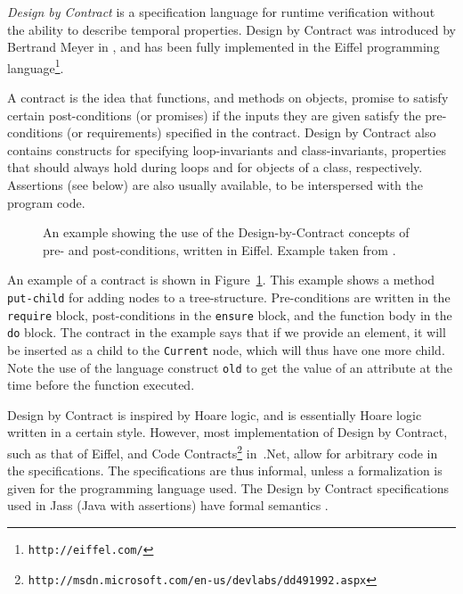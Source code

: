 \textit{Design by Contract} is a specification language for runtime
verification without the ability to describe temporal properties. Design by
Contract was introduced by Bertrand Meyer in \cite{meyer92applyingdbc}, and has
been fully implemented in the Eiffel programming
language\footnote{\texttt{http://eiffel.com/}}.

A contract is the idea that functions, and methods on objects, promise to
satisfy certain post-conditions (or promises) if the inputs they are given
satisfy the pre-conditions (or requirements) specified in the contract. Design
by Contract also contains constructs for specifying loop-invariants and
class-invariants, properties that should always hold during loops and for
objects of a class, respectively. Assertions (see below) are also usually
available, to be interspersed with the program code.

\begin{figure}[h!]
	\begin{center}
	\begin{minipage}{0.7\textwidth}
    \lstset{language=Eiffel}
		
	\end{minipage}
	\end{center}
  \caption{An example showing the use of the Design-by-Contract concepts of
    pre- and post-conditions, written in Eiffel. Example taken from
    \cite{meyer92applyingdbc}.}
	\label{figure-dbc-example}
\end{figure}

An example of a contract is shown in Figure~\ref{figure-dbc-example}. This
example shows a method \texttt{put-child} for adding nodes to a tree-structure.
Pre-conditions are written in the \texttt{require} block, post-conditions in
the \texttt{ensure} block, and the function body in the \texttt{do} block. The
contract in the example says that if we provide an element, it will be inserted
as a child to the \texttt{Current} node, which will thus have one more child.
Note the use of the language construct \texttt{old} to get the value of an
attribute at the time before the function executed.

Design by Contract is inspired by Hoare logic, and is essentially Hoare logic
written in a certain style. However, most implementation of Design by Contract,
such as that of Eiffel, and Code
Contracts\footnote{\texttt{http://msdn.microsoft.com/en-us/devlabs/dd491992.aspx}}
in~.Net, allow for arbitrary code in the specifications. The specifications are
thus informal, unless a formalization is given for the programming language
used. The Design by Contract specifications used in Jass (Java with assertions)
have formal semantics \cite{bartetzko01jass}.


